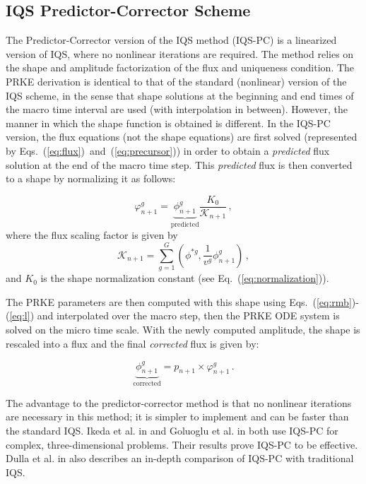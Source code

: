 \documentclass{elsarticle}
\newcommand{\eqt}[1]{Eq.~(\ref{#1})}                     %
\newcommand{\eqts}[2]{Eqs.~(\ref{#1})~and~(\ref{#2})}    %
\newcommand{\eqtss}[2]{Eqs.~(\ref{#1})-(\ref{#2})}       %
\newcommand{\iqspc}{IQS-PC\xspace}
\newcommand{\be}{\begin{equation}}
\newcommand{\ee}{\end{equation}}
\begin{document}
\subsection{IQS Predictor-Corrector Scheme}

The Predictor-Corrector version of the IQS method (\iqspc) is a linearized version of IQS, where no nonlinear iterations are required. The method relies on the shape and amplitude factorization of the flux and uniqueness condition. The PRKE derivation is identical to that of the standard (nonlinear) version of the IQS scheme, in the sense that shape solutions at the beginning and end times of the macro time interval are used (with interpolation in between). However, the manner in which the shape function is obtained is different.  In the \iqspc version, the flux equations (not the shape equations) are first solved (represented by \eqts{eq:flux}{eq:precursor}) in order to obtain a {\it predicted} flux solution at the end of the macro time step. This {\it predicted} flux is then converted to a shape by normalizing it as follows:

\be
\varphi^g_{n+1} = \underbrace{\phi^g_{n+1}}_{\text{predicted}} \frac{K_0}{\mathcal{K}_{n+1}} \,,
\label{eq:rescale}
\ee
where the flux scaling factor is given by
\be
\mathcal{K}_{n+1} =\sum_{g=1}^G\left(\phi^{*g},\frac{1}{v^g}\phi^g_{n+1}\right) \,,
\ee
and $K_0$ is the shape normalization constant (see \eqt{eq:normalization}).

The PRKE parameters are then computed with this shape using \eqtss{eq:rmb}{eq:l} and interpolated over the macro step, then the PRKE ODE system is solved on the micro time scale.  With the newly computed amplitude, the shape is rescaled into a flux and the final {\it corrected} flux is given by:

\be
\underbrace{\phi^g_{n+1}}_{\text{corrected}} = p_{n+1} \times \varphi^g_{n+1} \,.
\ee

The advantage to the predictor-corrector method is that no nonlinear iterations are necessary in this method; it is simpler to implement and can be faster than the standard IQS.  Ikeda et al. in \cite{Ikeda_2001} and Goluoglu et al. in \cite{Goluoglu_2001} 
both use \iqspc for complex, three-dimensional problems.  Their results prove \iqspc to be effective.  Dulla et al. in \cite{Dulla2008} also describes an in-depth comparison of \iqspc with traditional IQS. %
\end{document}
